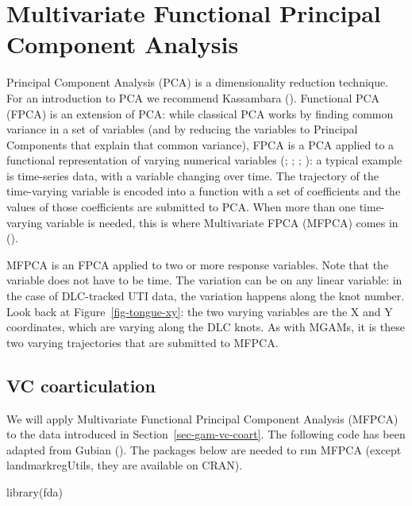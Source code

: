\documentclass[
  man,
  longtable,
  nolmodern,
  notxfonts,
  notimes,
  colorlinks=true,linkcolor=blue,citecolor=blue,urlcolor=blue]{apa7}
\newenvironment{Shaded}{\begin{snugshade}}{\end{snugshade}}
\newcommand{\FunctionTok}[1]{\textcolor[rgb]{0.28,0.35,0.67}{#1}}
\newcommand{\NormalTok}[1]{\textcolor[rgb]{0.00,0.23,0.31}{#1}}
\begin{document}
\section{Multivariate Functional Principal Component
Analysis}\label{sec-fpca}

Principal Component Analysis (PCA) is a dimensionality reduction
technique. For an introduction to PCA we recommend Kassambara
(). Functional PCA (FPCA) is an
extension of PCA: while classical PCA works by finding common variance
in a set of variables (and by reducing the variables to Principal
Components that explain that common variance), FPCA is a PCA applied to
a functional representation of varying numerical variables
(;
;
;
): a typical example
is time-series data, with a variable changing over time. The trajectory
of the time-varying variable is encoded into a function with a set of
coefficients and the values of those coefficients are submitted to PCA.
When more than one time-varying variable is needed, this is where
Multivariate FPCA (MFPCA) comes in ().

MFPCA is an FPCA applied to two or more response variables. Note that
the variable does not have to be time. The variation can be on any
linear variable: in the case of DLC-tracked UTI data, the variation
happens along the knot number. Look back at Figure~\ref{fig-tongue-xy}:
the two varying variables are the X and Y coordinates, which are varying
along the DLC knots. As with MGAMs, it is these two varying trajectories
that are submitted to MFPCA.

\subsection{VC coarticulation}\label{sec-fpca-vc}

We will apply Multivariate Functional Principal Component Analysis
(MFPCA) to the data introduced in Section~\ref{sec-gam-vc-coart}. The
following code has been adapted from Gubian
(). The packages below are needed to run
MFPCA (except landmarkregUtils, they are available on CRAN).

\begin{Shaded}
\begin{Highlighting}[]
\FunctionTok{library}\NormalTok{(fda)}
\end{Highlighting}
\end{Shaded}
\end{document}
